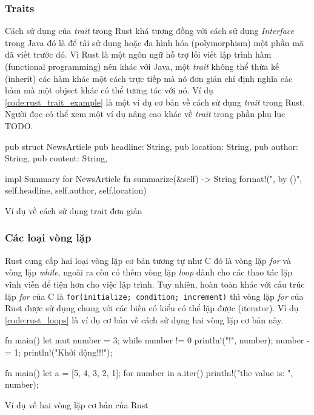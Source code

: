 \subsubsection{Traits}
Cách sử dụng của \emph{trait} trong Rust khá tương đồng với cách sử dụng \emph{Interface} trong Java đó là để tải sử dụng hoặc đa hình hóa (polymorphism) một phần mã đã viết trước đó.
Vì Rust là một ngôn ngữ hỗ trợ lối viết lập trình hàm (functional programming) nên khác với Java, một \emph{trait} không thể thừa kế (inherit) các hàm khác một cách trực tiếp mà nó đơn giản chỉ định nghĩa các hàm mà một object khác có thể tương tác với nó.
Ví dụ \ref{code:rust_trait_example} là một ví dụ cơ bản về cách sử dụng \emph{trait} trong Rust.
Người đọc có thể xem một ví dụ nâng cao khác về \emph{trait} trong phần phụ lục TODO.
\begin{listing}[ht]
\begin{rustcode}
pub struct NewsArticle {
    pub headline: String,
    pub location: String,
    pub author: String,
    pub content: String,
}

impl Summary for NewsArticle {
    fn summarize(&self) -> String {
        format!("{}, by {} ({})", self.headline, self.author, self.location)
    }
}
\end{rustcode}
\caption{Ví dụ về cách sử dụng trait đơn giản}
\label{code:rust_trait_example}
\end{listing}

\subsubsection{Các loại vòng lặp}
Rust cung cấp hai loại vòng lặp cơ bản tương tự như C đó là vòng lặp \emph{for} và vòng lặp \emph{while}, ngoài ra còn có thêm vòng lặp \emph{loop} dành cho các thao tác lặp vĩnh viễn để tiện hơn cho việc lập trình.
Tuy nhiên, hoàn toàn khác với cấu trúc lặp \emph{for} của C là \texttt{for(initialize; condition; increment)} thì vòng lặp \emph{for} của Rust được sử dụng chung với các biến có kiểu có thể lặp được (iterator).
Ví dụ \ref{code:rust_loops} là ví dụ cơ bản về cách sử dụng hai vòng lặp cơ bản này.

\begin{center}
\begin{listing}
\begin{minipage}[ht]{0.4\linewidth}
\begin{rustcode}
fn main() {
    let mut number = 3;
    while number != 0 {
        println!("{}!", number);
        number -= 1;
    }
    println!("Khởi động!!!");
}
\end{rustcode}
\end{minipage}
\qquad
\begin{minipage}[ht]{0.55\linewidth}
\begin{rustcode}
fn main() {
    let a = [5, 4, 3, 2, 1];
    for number in a.iter() {
        println!("the value is: {}", number);
    }
}
\end{rustcode}
\end{minipage}
\caption{Ví dụ về hai vòng lặp cơ bản của Rust}
\label{code:rust_loops}
\end{listing}
\end{center}

